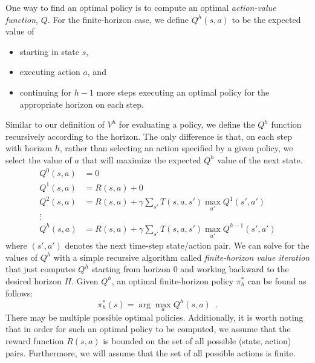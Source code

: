 One way to find an optimal policy is to compute an optimal {\em action-value function}, $Q$.  For the finite-horizon case, we define
$Q^h(s, a)$ to be the expected value of
\begin{itemize}
  \item starting in state $s$,
  \item executing action $a$, and
  \item continuing for $h - 1$ more steps executing an optimal policy
        for the appropriate horizon on each step.
\end{itemize}
Similar to our definition of $V^h$ for evaluating a policy, we define
the $Q^h$ function recursively according to the horizon.  The only
difference is that, on each step with horizon $h$, rather than
selecting an action specified by a given  policy, we select the value
of $a$ that will maximize the expected $Q^h$ value of the next state.
\begin{align}
  Q^0(s, a) & = 0                                                          \\
  Q^1(s, a) & = R(s, a) + 0                                                \\
  Q^2(s, a) & = R(s, a) + \gamma \sum_{s'}T(s, a, s') \max_{a'} Q^1(s', a')       \\
  \vdots
  \nonumber                                                                \\
  Q^h(s, a) & = R(s, a) + \gamma \sum_{s'}T(s, a, s') \max_{a'} Q^{h - 1}(s', a')
\end{align}
where $(s',a')$ denotes the next time-step state/action pair. We can solve for the values of $Q^h$ with a simple recursive algorithm
called {\it{finite-horizon value iteration}} that just computes $Q^h$ starting
from horizon 0 and working backward to the desired horizon
$H$. Given $Q^h$, an optimal finite-horizon policy $\pi_h^*$ can be found as follows:
\begin{equation}
  \pi_h^*(s) = \arg\max_{a}Q^h(s, a) \;\;.
\end{equation}
There may be multiple possible optimal policies.
Additionally, it is worth noting that in order for such an optimal policy to be
computed, we assume that the reward function $R(s,a)$ is bounded on the set of
all possible (state, action) pairs. Furthermore, we will assume that the set of
all possible actions is finite.

